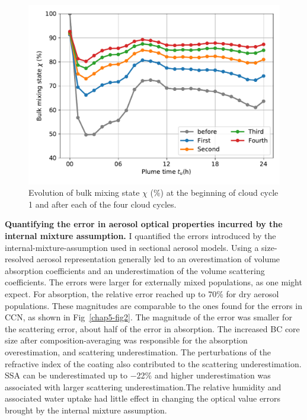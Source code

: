 \documentclass[edeposit,fullpage]{uiucthesis2009}
\begin{document}
\begin{figure}[H]
    \centering
    \includegraphics[scale=0.43]{chap5_figs/chap5-fig1.pdf}
    \caption{Evolution of bulk mixing state
      $\chi$ ($\%$) at the beginning of cloud cycle 1 and after each
      of the four cloud cycles.}
    \label{chap5-fig1}
\end{figure}

{\bf Quantifying the error in aerosol optical properties incurred by
  the internal mixture assumption.} I quantified the errors introduced
by the internal-mixture-assumption used in sectional aerosol
models. Using a size-resolved aerosol representation generally led to
an overestimation of volume absorption coefficients and an
underestimation of the volume scattering coefficients. The errors were
larger for externally mixed populations, as one might expect. For
absorption, the relative error reached up to 70\% for dry aerosol
populations. These magnitudes are comparable to the ones
\citet{Ching2017} found for the errors in CCN, as shown in
Fig~\ref{chap5-fig2}. The magnitude of the error was smaller for the
scattering error, about half of the error in absorption.
The increased BC core size after composition-averaging
  was responsible for the absorption overestimation, and scattering
  underestimation. The perturbations of the refractive index of the
  coating also contributed to the scattering underestimation. 
SSA can be underestimated up to $-$22\% and higher underestimation was associated with
larger scattering underestimation.The
relative humidity and associated water uptake had little effect in
changing the optical value errors brought by the internal mixture
assumption.
\end{document}
